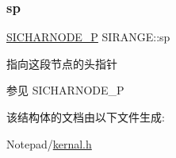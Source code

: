 \subsubsection{\texorpdfstring{sp}{sp}}
{\footnotesize\ttfamily \hyperlink{class_s_i_c_h_a_r_n_o_d_e}{S\+I\+C\+H\+A\+R\+N\+O\+D\+E\+\_\+P} S\+I\+R\+A\+N\+G\+E\+::sp}



指向这段节点的头指针 

\begin{DoxySeeAlso}{参见}
S\+I\+C\+H\+A\+R\+N\+O\+D\+E\+\_\+P 
\end{DoxySeeAlso}


该结构体的文档由以下文件生成\+:\begin{DoxyCompactItemize}
\item 
Notepad/\hyperlink{kernal_8h}{kernal.\+h}\end{DoxyCompactItemize}
